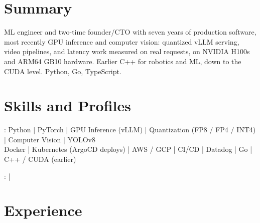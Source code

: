 \documentclass[print]{jack-resume}
\begin{document}
\pagecolor{darkmodeBackground}


\begin{minipage}[t][1cm][t]{.03\textwidth}
    \hfill
\end{minipage}

\section{Summary}
ML engineer and two-time founder/CTO with seven years of production software, most recently GPU inference and computer vision: quantized vLLM serving, video pipelines, and latency work measured on real requests, on NVIDIA H100s and ARM64 GB10 hardware. Earlier C++ for robotics and ML, down to the CUDA level. Python, Go, TypeScript.
\sectionsep

\section{Skills and Profiles}
:
Python \hfill | \hfill
PyTorch \hfill | \hfill
GPU Inference (vLLM) \hfill | \hfill
Quantization (FP8 / FP4 / INT4) \hfill | \hfill
Computer Vision \hfill | \hfill
YOLOv8 \\
\hspace{1.0cm} Docker \hfill | \hfill
Kubernetes (ArgoCD deploys) \hfill | \hfill
AWS / GCP \hfill | \hfill
CI/CD \hfill | \hfill
Datadog \hfill | \hfill
Go \hfill | \hfill
C++ / CUDA (earlier) \\

\raggedright{
    :
      \href{https://www.linkedin.com/in/jack-sturtevant/}{ \ExternalLink} |
     \href{https://github.com/jacksturt}{ \ExternalLink}}

\section{Experience}
\end{document}
